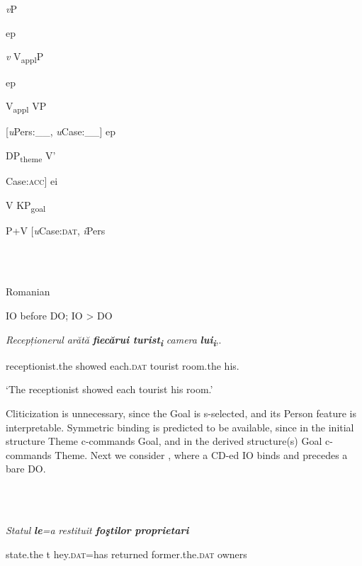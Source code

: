 \documentclass[output=paper,colorlinks,citecolor=brown]{./langscibook}
\begin{document}
\ea%
    \label{ex:key:32}
    \gll\\
        \\
    \glt
    \z

            \textit{v}P

  ep

  \textit{v}           V\textsubscript{appl}P

      ep

    V\textsubscript{appl}        VP

    [\textit{u}Pers:\_\_, \textit{u}Case:\_\_]  ep

          DP\textsubscript{theme}      V’

Case:\textsc{acc}]  ei

    V      KP\textsubscript{goal}

          P+V    [\textit{u}Case:\textsc{dat}, \textit{i}Pers

\ea%
    \label{ex:key:33}
    \gll\\
        \\
    \glt
    \z

          Romanian \citep[201]{CornilescuDinuTigău2017Dative}

IO before DO; IO > DO 

  \textit{Recepționerul}  \textit{arătă}    \textbf{\textit{fiecărui} \textit{turist}}\textbf{\textit{\textsubscript{i}}}    \textit{camera} \textbf{\textit{lui}}\textbf{\textit{\textsubscript{i}}},.

  receptionist.the  showed   each.\textsc{dat} tourist   room.the his.

  ‘The receptionist showed each tourist his room.’

Cliticization is unnecessary, since the Goal is s-selected, and its Person feature is interpretable. Symmetric binding is predicted to be available, since in the initial structure Theme c-commands Goal, and in the derived structure(s) Goal c-commands Theme. Next we consider , where a CD-ed IO binds and precedes a bare DO. 

\ea%
    \label{ex:key:34}
    \gll\\
        \\
    \glt
    \z

          \textit{Statul}    \textbf{\textit{le}}\textit{=a}   \textit{restituit}    \textbf{\textit{foştilor} \textit{proprietari}}    

state.the t  hey.\textsc{dat}=has returned   former.the.\textsc{dat}       owners 
\end{document}
